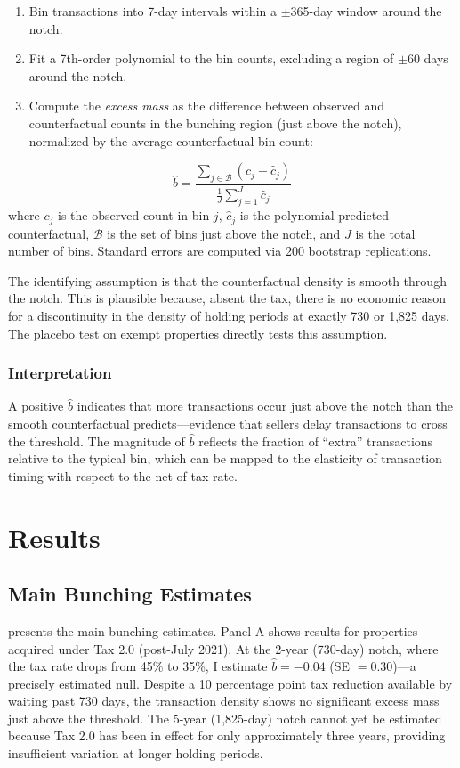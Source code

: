\documentclass[12pt]{article}
\begin{document}
\begin{enumerate}
  \item Bin transactions into 7-day intervals within a $\pm$365-day window around the notch.
  \item Fit a 7th-order polynomial to the bin counts, excluding a region of $\pm$60 days around the notch.
  \item Compute the \textit{excess mass} as the difference between observed and counterfactual counts in the bunching region (just above the notch), normalized by the average counterfactual bin count:
\end{enumerate}
\begin{equation}
  \hat{b} = \frac{\sum_{j \in \mathcal{B}} (c_j - \hat{c}_j)}{\frac{1}{J} \sum_{j=1}^{J} \hat{c}_j}
\end{equation}
where $c_j$ is the observed count in bin $j$, $\hat{c}_j$ is the polynomial-predicted counterfactual, $\mathcal{B}$ is the set of bins just above the notch, and $J$ is the total number of bins. Standard errors are computed via 200 bootstrap replications.

The identifying assumption is that the counterfactual density is smooth through the notch. This is plausible because, absent the tax, there is no economic reason for a discontinuity in the density of holding periods at exactly 730 or 1,825 days. The placebo test on exempt properties directly tests this assumption.

\subsubsection*{Interpretation} A positive $\hat{b}$ indicates that more transactions occur just above the notch than the smooth counterfactual predicts---evidence that sellers delay transactions to cross the threshold. The magnitude of $\hat{b}$ reflects the fraction of ``extra'' transactions relative to the typical bin, which can be mapped to the elasticity of transaction timing with respect to the net-of-tax rate.


\section{Results}

\subsection{Main Bunching Estimates}

 presents the main bunching estimates. Panel A shows results for properties acquired under Tax 2.0 (post-July 2021). At the 2-year (730-day) notch, where the tax rate drops from 45\% to 35\%, I estimate $\hat{b}=-0.04$ (SE $= 0.30$)---a precisely estimated null. Despite a 10 percentage point tax reduction available by waiting past 730 days, the transaction density shows no significant excess mass just above the threshold. The 5-year (1,825-day) notch cannot yet be estimated because Tax 2.0 has been in effect for only approximately three years, providing insufficient variation at longer holding periods.
\end{document}
